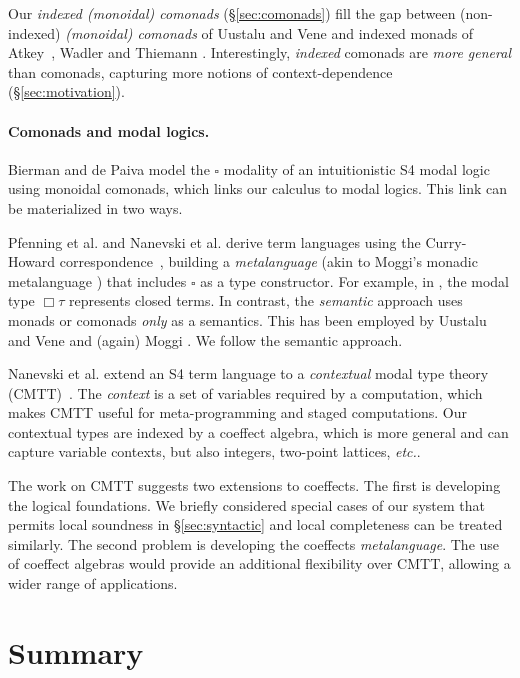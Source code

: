Our \emph{indexed (monoidal) comonads} (\S\ref{sec:comonads}) fill the gap between (non-indexed)
\emph{(monoidal) comonads} of Uustalu and Vene \cite{comonads-notions}
and indexed monads of Atkey~\cite{monads-parameterised-notions}, Wadler and Thiemann
\cite{monads-effects-marriage}. Interestingly, \emph{indexed} comonads are \emph{more
general} than comonads, capturing more notions of context-dependence (\S\ref{sec:motivation}).


\vspace{-1em}
\paragraph{Comonads and modal logics.}

Bierman and de Paiva \cite{logic-intuitionistic-modal} model the
$\square$ modality of an intuitionistic S4 modal logic using monoidal
comonads, which links our calculus to modal logics.  This link can be
materialized in two ways.

Pfenning et al. and Nanevski et al.  derive term languages using the Curry-Howard
correspondence~\cite{logic-modal-reconstruction,logic-intuitionistic-modal,logic-cmtt},
building a \emph{metalanguage} (akin to Moggi's monadic metalanguage
\cite{monad-notions}) that includes $\square$ as a type
constructor. For example, in \cite{logic-modal-reconstruction}, the
modal type $\Box \tau$ represents closed terms.
In contrast, the \emph{semantic} approach uses monads or comonads
\emph{only} as a semantics.  This has been employed by Uustalu and
Vene and (again) Moggi \cite{monad-notions,comonads-notions}.  We
follow the semantic approach.

Nanevski et al. extend an S4 term language to a \emph{contextual}
modal type theory (CMTT)~\cite{logic-cmtt}.
The \emph{context} is a set of variables required by a computation, which
makes CMTT useful for meta-programming and staged computations. Our contextual types are
indexed by a coeffect algebra, which is more general and can capture
variable contexts, but also integers, two-point lattices, \emph{etc.}.

The work on CMTT suggests two extensions to coeffects. The first is
developing the logical foundations. We briefly considered special cases
of our system that permits local soundness in \S\ref{sec:syntactic} and
local completeness can be treated similarly. The second problem is 
developing the coeffects \emph{metalanguage}. The use of coeffect algebras
would provide an additional flexibility over CMTT, allowing a wider range 
of applications.

\section{Summary}